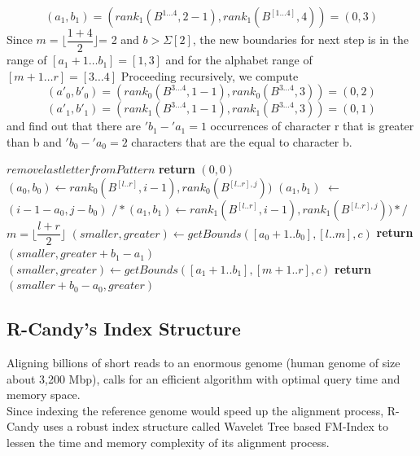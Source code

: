 \documentclass[11pt,a4paper]{report}
\begin{document}
$$(a_{1}, b_{1})=(rank_{1} ( B^{1\ldots 4} ,  2-1), rank_{1} (B^[1\ldots 4] , 4)) = (0 , 3) $$
Since  $m=\lfloor \dfrac  {1+4}{2} \rfloor$= 2 and $b > \Sigma[2]$,
the new boundaries for next step is in the range of $[a_{1}+1\ldots b_{1}]
=[1,3]$ and for the alphabet range of $[m+1\ldots r] = [3\ldots 4]$
Proceeding recursively, we compute
$$(a\prime_{0}, b\prime_{0})=(rank_{0} ( B^{3\ldots 4} ,  1-1), rank_{0} (B^{3\ldots 4}, 3)) = (0 , 2) $$
$$(a\prime_{1}, b\prime_{1})=(rank_{1} ( B^{3\ldots 4} ,  1-1), rank_{1} (B^{3\ldots 4}, 3)) = (0 , 1) $$
and find out that there are $\prime{b}_{1}-\prime{a}_{1}=1$ occurrences 
of character r that is greater than b and $\prime{b}_{0}-\prime{a}_{0}=2 $ 
characters that are the equal to character b.
\begin{algorithm}[H]
   \caption{}
    \begin{algorithmic}[1] 
            	\State $remove last letter from Pattern$
            	\State \textbf{return} $(0,0)$
            \Else
        	     \State $(a_{0}, b_{0}) \leftarrow  rank_{0}( B^{[l..r]}, i-1), rank_{0}(B^{[l..r],j}))$
        		 \State $(a_{1}, b_{1})$ $\leftarrow$ $(i-1-a_{0}, j - b_{0}) $
        		 \State $/* (a_{1}, b_{1}) \leftarrow  rank_{1}( B^{[l..r]}, i-1), rank_{1}(B^{[l..r],j})) */$
        		 \State $m = \lfloor \dfrac  {l+r}{2} \rfloor$
        		 	\State $(smaller, greater) \leftarrow getBounds ([a_{0}+1..b_{0}],[l..m],c)$
        		 	\State \textbf{return} $(smaller, greater+b_{1}-a_{1})$
     	  		\Else 
     	  			\State $(smaller, greater) \leftarrow getBounds ([a_{1}+1..b_{1}],[m+1..r],c)$ 
     	  			\State \textbf{return} $(smaller + b_{0}-a_{0}, greater)$
     		   \EndIf
     	   \EndIf
     
    \EndFunction

	\end{algorithmic}
  \label{smaller-greater}	
\end{algorithm}




\subsection{R-Candy's Index Structure} 
\label{R-Candy's Index Structure}

Aligning billions of short reads to an enormous genome 
(human genome of size about 3,200 Mbp), calls for an 
efficient algorithm with optimal query time and memory 
space.\\ Since indexing the reference genome would 
speed up the alignment process, R-Candy uses a robust 
index structure called Wavelet Tree based FM-Index to 
lessen the time and memory complexity of its alignment 
process.
\end{document}
